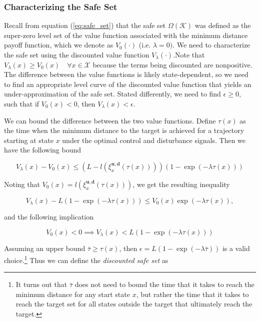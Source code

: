 \documentclass{journal}
\newcommand{\K}{\mathcal{K}}
\newcommand{\X}{\mathcal{X}}
\newcommand{\bu}{\bm{u}}
\newcommand{\bdelta}{\bm{d}}
\newcommand{\bx}{\xi}
\begin{document}
\subsubsection{Characterizing the Safe Set}

Recall from equation (\ref{eq:safe_set}) that the safe set $\Omega(\K)$ was defined as the super-zero level set of the value function associated with the minimum distance payoff function, which we denote as  $V_0(\cdot)$ (i.e. $\lambda = 0)$. We need to characterize the safe set using the discounted value function $V_{\lambda}(\cdot)$.Note that $V_{\lambda}(x) \geq V_0(x) \quad \forall x\in \X$ because the terms being discounted are nonpositive. The difference between the value functions is likely state-dependent, so we need to find an appropriate level curve of the discounted value function that yields an under-approximation of the safe set. Stated differently, we need to find $\epsilon \geq 0$, such that if $V_0(x)<0$, then $V_\lambda(x)<\epsilon$. 

We can bound the difference between the two value functions.  Define $\tau(x)$ as the time when the minimum distance to the target is achieved for a trajectory starting at state $x$ under the optimal control and disturbance signals. Then we have the following bound

\begin{equation}
V_{\lambda}(x) - V_0(x)  \leq (L - l(\bx_{x}^{\bu,\bdelta}(\tau(x))))( 1 -  \exp(-\lambda \tau(x))) 
\end{equation}

Noting that $V_0(x)=l(\bx_{x}^{\bu,\bdelta}(\tau(x)))$, we get the resulting inequality

\begin{equation}
V_{\lambda}(x) -  L( 1 -  \exp(-\lambda \tau(x))) \leq V_0(x) \exp(-\lambda \tau(x)), 
\end{equation}

\noindent and the following implication

\begin{equation}
V_0(x)<0 \implies V_{\lambda}(x) <  L( 1 -  \exp(-\lambda \tau(x)))
\end{equation}

Assuming an upper bound  $\bar{\tau} \geq \tau(x)$, then $\epsilon = L( 1 -  \exp(-\lambda \bar{\tau}))$ is a valid choice.\footnote{It turns out that $\bar{\tau}$ does not need to bound the time that it takes to reach the minimum distance for any start state $x$, but rather the time that it takes to reach the target set for all states outside the target that ultimately reach the target.} Thus we can define the \emph{discounted safe set} as 
\end{document}

